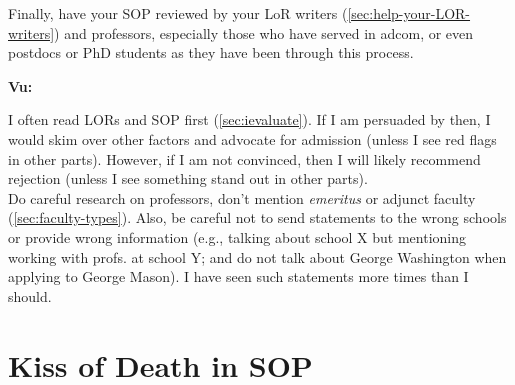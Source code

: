 \documentclass[oneside,11pt,dvipsnames]{book}
\newenvironment{commentbox}[1][]{
  \small
  \begin{mybox}
    {\small \textbf{#1}}
  }{
  \end{mybox}
}
\begin{document}
Finally, have your SOP reviewed by your LoR writers (\autoref{sec:help-your-LOR-writers}) and professors, especially those who have served in adcom, or even postdocs or PhD students as they have been through this process.

\begin{commentbox}[Vu:]
  I often read LORs and SOP first (\autoref{sec:ievaluate}). If I am
  persuaded by then, I would skim over other factors and advocate for
  admission (unless I see red flags in other parts). However, if I am not
  convinced, then I will likely recommend rejection (unless I see
  something stand out in other parts).\\

  
  Do careful research on professors, don't mention \emph{emeritus} or adjunct faculty (\autoref{sec:faculty-types}).
  Also, be careful not to send statements to the wrong schools or provide wrong information (e.g., talking about school X but mentioning working with
  profs. at school Y; and do not talk about George Washington when applying to George Mason). I have seen such statements more times than I should.
\end{commentbox}


\section{Kiss of Death in SOP} \label{sec:kiss-of-death-sop}
\end{document}
